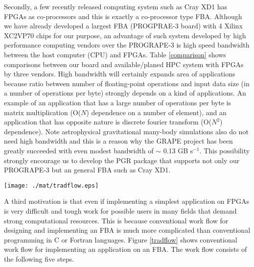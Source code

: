 \documentclass[times, 10pt,twocolumn]{article}
\begin{document}
Secondly, a few recently released computing system such as Cray XD1 
has FPGAs as co-processors and this is exactly a co-processor type FBA.
Although we have already developed a largest FBA (PROGPRAE-3 board)
with 4 Xilinx XC2VP70 chips for our purpose, 
an advantage of such system developed by high performance computing vendors
over the PROGRAPE-3 is high speed bandwidth between the host computer (CPU)
and FPGAs. Table \ref{comparison} shows comparisons between our board
and available/planed HPC system with FPGAs by three vendors.
High bandwidth will certainly expands area of applications because ratio between 
number of floating-point operations and input data size (in a number of operations per byte)
strongly depends on a kind of applications. 
An example of an application that has a large number of operations per byte
is matrix multiplication (O($N$) dependence on a number of element),
and an application that has opposite nature is discrete fourier transform (O($N^2$) dependence).
Note astrophysical gravitational many-body simulations also do not need high bandwidth
and this is a reason why the GRAPE project has been greatly succeeded 
with even modest bandwidth of $\sim$ 0.13 GB s$^{-1}$.
This possibility strongly encourage us to develop the PGR package
that supports not only our PROGRAPE-3 but an general FBA such as Cray XD1.

\begin{figure*}[htb]
\begin{center}
\texttt{[image: ./mat/tradflow.eps]}
\caption{Conventional work flow for implementing an application on a RS system.}
\label{tradflow}
\end{center}
\end{figure*}

A third motivation is that even if implementing a simplest
application on FPGAs is very difficult and tough work for
possible users in many fields that demand strong computational resources.
This is because conventional work flow for designing and implementing
an FBA is much more complicated than 
conventional programming in C or Fortran languages.
Figure \ref{tradflow} shows conventional work flow for
implementing an application on an FBA.
The work flow consists of the following five steps.
\end{document}
